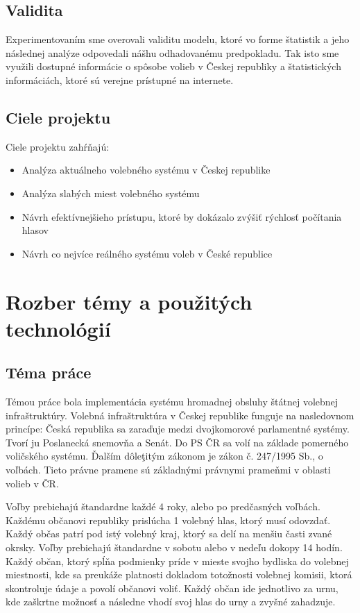 \documentclass[12pt,a4paper,titlepage,final]{article}
\begin{document}
\subsection{Validita}
Experimentovaním sme overovali validitu modelu, ktoré vo forme štatistik a jeho následnej analýze odpovedali nášhu odhadovanému predpokladu. Tak isto sme využili dostupné informácie o spôsobe volieb v Českej republiky a štatistických informáciách, ktoré sú verejne prístupné na internete.

\newpage


\subsection{Ciele projektu}
Ciele projektu zahŕňajú:
\begin{itemize}
\item Analýza aktuálneho volebného systému v Českej republike
\item Analýza slabých miest volebného systému
\item Návrh efektívnejšieho prístupu, ktoré by dokázalo zvýšiť rýchlosť počítania hlasov
\item Návrh co nejvíce reálného systému voleb v České republice 
\end{itemize}


\section{Rozber témy a použitých technológií}

\indent

\subsection{Téma práce}
Témou práce bola implementácia systému hromadnej obsluhy štátnej volebnej infraštruktúry. Volebná infraštruktúra v Českej republike funguje na nasledovnom princípe:
Česká republika sa zaraďuje medzi dvojkomorové parlamentné 
systémy. Tvorí ju Poslanecká snemovňa a Senát. Do PS ČR sa volí na 
základe pomerného voličského systému.  Ďalším dôleţitým zákonom je 
zákon č. 247/1995 Sb., o voľbách. Tieto právne pramene sú základnými právnymi 
prameňmi v oblasti volieb v ČR.\cite{Seda:Voleb}

Voľby prebiehajú štandardne každé 4 roky, alebo po predčasných voľbách. Každému občanovi republiky prislúcha 1 volebný hlas, ktorý musí odovzdať. Každý občas patrí pod istý volebný kraj, ktorý sa delí na menšiu časti zvané okrsky. Voľby prebiehajú štandardne v sobotu alebo v nedeľu dokopy 14 hodín. Každý občan, ktorý spĺňa podmienky príde v mieste svojho bydliska do volebnej miestnosti, kde sa preukáže platnosti dokladom totožnosti volebnej komisii, ktorá skontroluje údaje a povolí občanovi voliť. Každý občan ide jednotlivo za urnu, kde zaškrtne možnosť a následne vhodí svoj hlas do urny a zvyšné zahadzuje.
\end{document}
